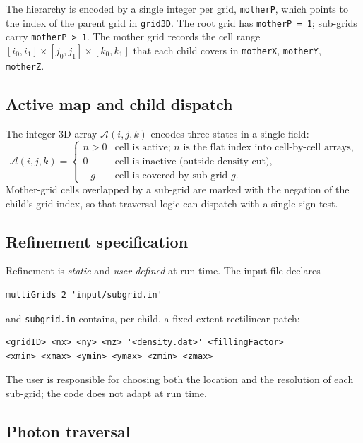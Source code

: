 \documentclass[11pt,a4paper]{my_memo}
\begin{document}
The hierarchy is encoded by a single integer per grid,
\texttt{motherP}, which points to the index of the parent grid in
\texttt{grid3D}.  The root grid has \texttt{motherP\,=\,1}; sub-grids carry
\texttt{motherP\,>\,1}.  The mother grid records the cell range
$[i_0,i_1]\times[j_0,j_1]\times[k_0,k_1]$ that each child covers in
\texttt{motherX}, \texttt{motherY}, \texttt{motherZ}.

\subsection{Active map and child dispatch}

The integer 3D array $\mathcal{A}(i,j,k)$ encodes three states in a single
field:
\begin{equation}
   \mathcal{A}(i,j,k) =
   \begin{cases}
      n > 0 & \text{cell is active; } n \text{ is the flat index into cell-by-cell arrays,} \\
      0     & \text{cell is inactive (outside density cut),} \\
      -g    & \text{cell is covered by sub-grid } g.
   \end{cases}
\end{equation}
Mother-grid cells overlapped by a sub-grid are marked with the negation of
the child's grid index, so that traversal logic can dispatch with a single
sign test.

\subsection{Refinement specification}

Refinement is \emph{static} and \emph{user-defined} at run time.  The input
file declares
\begin{lstlisting}
multiGrids 2 'input/subgrid.in'
\end{lstlisting}
and \texttt{subgrid.in} contains, per child, a fixed-extent rectilinear
patch:
\begin{lstlisting}
<gridID> <nx> <ny> <nz> '<density.dat>' <fillingFactor>
<xmin> <xmax> <ymin> <ymax> <zmin> <zmax>
\end{lstlisting}
The user is responsible for choosing both the location and the resolution
of each sub-grid; the code does not adapt at run time.

\subsection{Photon traversal}
\end{document}
